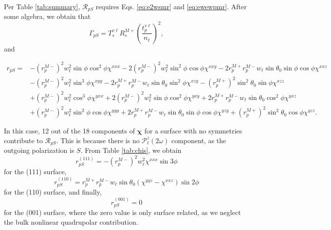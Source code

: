 \documentclass[aps,prb,10pt,showpacs,letterpaper,twocolumn]{revtex4-1}
\begin{document}
Per Table \ref{tab:summary}, $\mathcal{R}_{pS}$ requires Eqs. \eqref{eq:e2wsmr}
and \eqref{eq:ewewpmr}. After some algebra, we obtain that
\begin{equation}\label{mcv}
\Gamma_{pS} =
T_{s}^{v\ell}R^{M+}_{s}
\left(\frac{t^{v\ell}_{p}}{n_{\ell}}\right)^{2},
\end{equation}
and
\begin{widetext}
\begin{equation}\label{eq:001rps}
\begin{split}  
r_{pS}=
&- \left(r^{M-}_{p}\right)^{2}w^{2}_{\ell}\sin\phi\cos^{2}\phi\chi^{xxx}
 - 2\left(r^{M-}_{p}\right)^{2}w^{2}_{\ell}\sin^{2}\phi\cos\phi\chi^{xxy}
 - 2r^{M+}_{p}r^{M-}_{p}w_{\ell}\sin\theta_{0}\sin\phi\cos\phi\chi^{xxz}\\
&- \left(r^{M-}_{p}\right)^{2}w^{2}_{\ell}\sin^{3}\phi\chi^{xyy}
 - 2r^{M+}_{p}r^{M-}_{p}w_{\ell}\sin\theta_{0}\sin^{2}\phi\chi^{xzy}
 - \left(r^{M+}_{p}\right)^{2}\sin^{2}\theta_{0}\sin\phi\chi^{xzz}\\
&+ \left(r^{M-}_{p}\right)^{2}w^{2}_{\ell}\cos^{3}\phi\chi^{yxx}
 + 2\left(r^{M-}_{p}\right)^{2}w^{2}_{\ell}\sin\phi\cos^{2}\phi\chi^{yxy}
 + 2r^{M+}_{p}r^{M-}_{p}w_{\ell}\sin\theta_{0}\cos^{2}\phi\chi^{yxz}\\
&+ \left(r^{M-}_{p}\right)^{2}w^{2}_{\ell}\sin^{2}\phi\cos\phi\chi^{yyy}
 + 2r^{M+}_{p}r^{M-}_{p}w_{\ell}\sin\theta_{0}\sin\phi\cos\phi\chi^{yzy}
 + \left(r^{M+}_{p}\right)^{2}\sin^{2}\theta_{0}\cos\phi\chi^{yzz}.  
\end{split}
\end{equation}
\end{widetext}
In this case, 12 out of the 18 components of $\boldsymbol{\chi}$ for a surface
with no symmetries contribute to $\mathcal{R}_{pS}$. This is because there is no
$\mathcal{P}^{z}_\ell(2\omega)$ component, as the outgoing polarization is $S$.
From Table \ref{tab:chis}, we obtain
\begin{equation}\label{eq:rps111}
r^{(111)}_{pS} = - \left(r^{M-}_{p}\right)^{2}w^{2}_{\ell}\chi^{xxx}\sin3\phi
\end{equation}
for the (111) surface,
\begin{equation}\label{eq:rps110}
r^{(110)}_{pS} =
r^{M+}_{p}r^{M-}_{p}w_{\ell}\sin\theta_{0}(\chi^{yyz} - \chi^{xxz})\sin2\phi
\end{equation}
for the (110) surface, and finally,
\begin{equation}\label{eq:rps001}
r^{(001)}_{pS} = 0
\end{equation}
for the (001) surface, where the zero value is only surface related, as we
neglect the bulk nonlinear quadrupolar contribution.\cite{sipePRB87}
\end{document}
